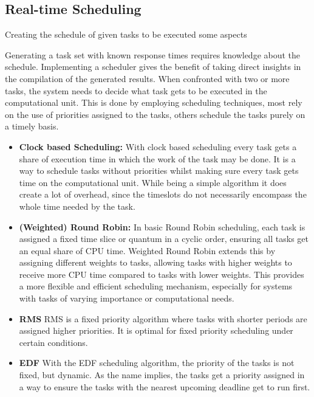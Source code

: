 \subsection{Real-time Scheduling}\label{sec:scheduling}
Creating the schedule of given tasks to be executed some aspects

Generating a task set with known response times requires knowledge about the schedule. Implementing a scheduler gives the benefit of taking direct insights in the compilation of the generated results. 
When confronted with two or more tasks, the system needs to decide what task gets to be executed in the computational unit.
This is done by employing scheduling techniques, most rely on the use of priorities assigned to the tasks, others schedule the tasks purely on a timely basis.

\begin{itemize}
	\item \textbf{Clock based Scheduling:}
		With clock based scheduling every task gets a share of execution time in which the work of the task may be done. It is a way to schedule tasks without priorities whilst making sure every task gets time on the computational unit. While being a simple algorithm it does create a lot of overhead, since the timeslots do not necessarily encompass the whole time needed by the task.
	\item \textbf{(Weighted) Round Robin:}
		In basic Round Robin scheduling, each task is assigned a fixed time slice or quantum in a cyclic order, ensuring all tasks get an equal share of CPU time. Weighted Round Robin extends this by assigning different weights to tasks, allowing tasks with higher weights to receive more CPU time compared to tasks with lower weights. This provides a more flexible and efficient scheduling mechanism, especially for systems with tasks of varying importance or computational needs. \cite{helmyOptimizingRoundRobinScheduling2024}
	\item \textbf{\ac{RMS}} 
		\ac{RMS} is a fixed priority algorithm where tasks with shorter periods are assigned higher priorities. 
		It is optimal for fixed priority scheduling under certain conditions. \cite{lehoczkyRateMonotonicScheduling1989}
	\item \textbf{\ac{EDF}} 
		With the \ac{EDF} scheduling algorithm, the priority of the tasks is not fixed, but dynamic. 
		As the name implies, the tasks get a priority assigned in a way to ensure the tasks with the nearest upcoming deadline get to run first.\cite{lehoczkyPerformanceRealtimeBus1986}
\end{itemize}

